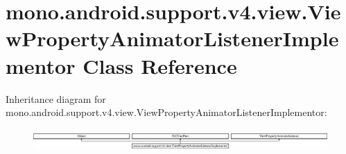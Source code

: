\hypertarget{classmono_1_1android_1_1support_1_1v4_1_1view_1_1_view_property_animator_listener_implementor}{}\section{mono.\+android.\+support.\+v4.\+view.\+View\+Property\+Animator\+Listener\+Implementor Class Reference}
\label{classmono_1_1android_1_1support_1_1v4_1_1view_1_1_view_property_animator_listener_implementor}
Inheritance diagram for mono.\+android.\+support.\+v4.\+view.\+View\+Property\+Animator\+Listener\+Implementor\+:\begin{figure}[H]
\begin{center}
\leavevmode
\includegraphics[height=0.860215cm]{classmono_1_1android_1_1support_1_1v4_1_1view_1_1_view_property_animator_listener_implementor}
\end{center}
\end{figure}
